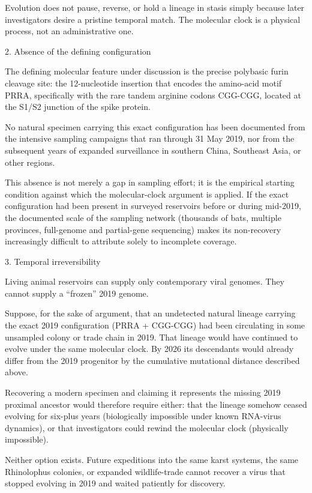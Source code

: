 Evolution does not pause, reverse, or hold a lineage in stasis simply because later investigators desire a pristine temporal match. The molecular clock is a physical process, not an administrative one.

2. Absence of the defining configuration

The defining molecular feature under discussion is the precise polybasic furin cleavage site: the 12-nucleotide insertion that encodes the amino-acid motif PRRA, specifically with the rare tandem arginine codons CGG-CGG, located at the S1/S2 junction of the spike protein.

No natural specimen carrying this exact configuration has been documented from the intensive sampling campaigns that ran through 31 May 2019, nor from the subsequent years of expanded surveillance in southern China, Southeast Asia, or other regions.  

This absence is not merely a gap in sampling effort; it is the empirical starting condition against which the molecular-clock argument is applied. If the exact configuration had been present in surveyed reservoirs before or during mid-2019, the documented scale of the sampling network (thousands of bats, multiple provinces, full-genome and partial-gene sequencing) makes its non-recovery increasingly difficult to attribute solely to incomplete coverage.

3. Temporal irreversibility

Living animal reservoirs can supply only contemporary viral genomes. They cannot supply a “frozen” 2019 genome.

Suppose, for the sake of argument, that an undetected natural lineage carrying the exact 2019 configuration (PRRA + CGG-CGG) had been circulating in some unsampled colony or trade chain in 2019. That lineage would have continued to evolve under the same molecular clock. By 2026 its descendants would already differ from the 2019 progenitor by the cumulative mutational distance described above.  

Recovering a modern specimen and claiming it represents the missing 2019 proximal ancestor would therefore require either:
that the lineage somehow ceased evolving for six-plus years (biologically impossible under known RNA-virus dynamics), or  
that investigators could rewind the molecular clock (physically impossible).

Neither option exists. Future expeditions into the same karst systems, the same Rhinolophus colonies, or expanded wildlife-trade cannot recover a virus that stopped evolving in 2019 and waited patiently for discovery.

